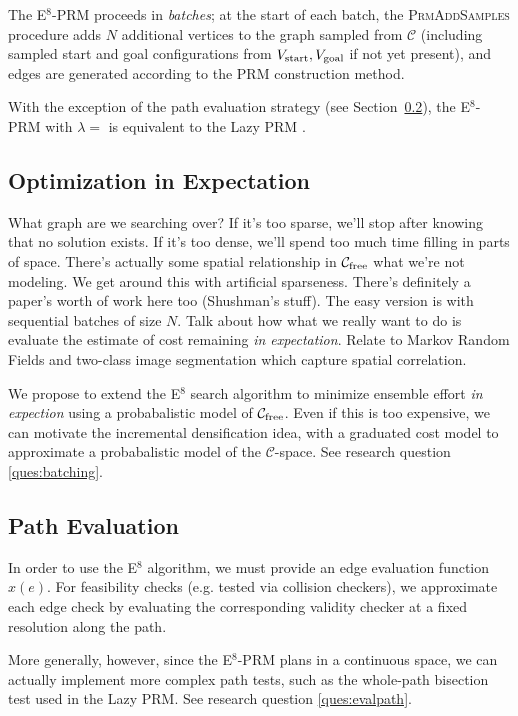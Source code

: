 The E$^8$-PRM proceeds in \emph{batches};
at the start of each batch,
the \textsc{PrmAddSamples} procedure adds
$N$ additional vertices to the graph sampled from $\mathcal{C}$
(including sampled start and goal configurations from
$V_{\mbox{\scriptsize start}}, V_{\mbox{\scriptsize goal}}$
if not yet present),
and edges are generated according to the PRM construction method.

With the exception of the path evaluation strategy
(see Section~\ref{subsec:prm-path-eval}),
the E$^8$-PRM with $\lambda = $
is equivalent to 
the Lazy PRM \cite{bohlin2000lazyprm}.

\subsection{Optimization in Expectation}

What graph are we searching over?
If it's too sparse, we'll stop after knowing that no solution exists.
If it's too dense, we'll spend too much time filling in parts of
space.
There's actually some spatial relationship in
$\mathcal{C}_{\mbox{\scriptsize free}}$ what we're not
modeling.
We get around this with artificial sparseness.
There's definitely a paper's worth of work here too (Shushman's stuff).
The easy version is with sequential batches of size $N$.
Talk about how what we really want to do
is evaluate the estimate of cost remaining
\emph{in expectation}.
Relate to Markov Random Fields and two-class image segmentation
which capture spatial correlation.

We propose to extend the E$^8$ search algorithm
to minimize ensemble effort \emph{in expection}
using a probabalistic model of $\mathcal{C}_{\mbox{\scriptsize free}}$.
Even if this is too expensive,
we can motivate the incremental densification idea,
with a graduated cost model
to approximate a probabalistic model
of the $\mathcal{C}$-space.
See research question \ref{ques:batching}.

\subsection{Path Evaluation}
\label{subsec:prm-path-eval}

In order to use the E$^8$ algorithm,
we must provide an edge evaluation function $x(e)$.
For feasibility checks
(e.g. tested via collision checkers),
we approximate each edge check
by evaluating the corresponding validity checker
at a fixed resolution along the path.

More generally, however,
since the E$^8$-PRM plans in a continuous space,
we can actually implement more complex path tests,
such as the whole-path bisection test used in the
Lazy PRM.
See research question \ref{ques:evalpath}.

